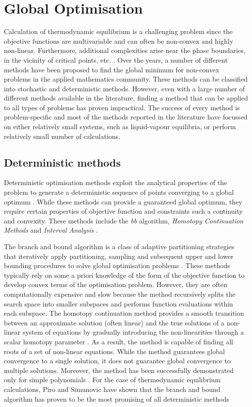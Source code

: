 	\section{Global Optimisation}
	Calculation of thermodynamic equilibrium is a challenging problem since the objective functions are multivariable and can often be non-convex and highly non-linear. Furthermore, additional complexities arise near the phase boundaries, in the vicinity of critical points, etc. \cite{Wakeham04,TEH2002745}. Over the years, a number of different methods have been proposed to find the global minimum for non-convex problems in the applied mathematics community. These methods can be classified into stochastic and deterministic methods. However, even with a large number of different methods available in the literature, finding a method that can be applied to all types of problems has proven impractical. The success of every method is problem-specific and most of the methods reported in the literature have focussed on either relatively small systems, such as liquid-vapour equilibria, or perform relatively small number of calculations.

	\subsection{Deterministic methods}
	Deterministic optimisation methods exploit the analytical properties of the problem to generate a deterministic sequence of points converging to a global optimum \cite{PARDALOS2000209}. While these methods can provide a guaranteed global optimum, they require certain properties of objective function and constraints such a continuity and convexity. These methods include the \emph{\gls{bb}} algorithm, \emph{Homotopy Continuation Methods}  and \emph{Interval Analysis} \cite{Floudas99}.

	The branch and bound algorithm is a class of adaptive partitioning strategies that iteratively apply partitioning, sampling and subsequent upper and lower bounding procedures to solve global optimisation problems \cite{Floudas99}.  These methods typically rely on some a priori knowledge of the form of the objective function to  develop convex terms of the optimisation problem. However, they are often computationally expensive and slow \cite{Wakeham04,Nichita02} because the method recursively splits the search space into smaller subspaces and performs function evaluations within each subspace. The homotopy continuation method provides a smooth transition between an approximate solution (often linear) and the true solutions of a non-linear system of equations by gradually introducing the non-linearities through a scalar homotopy parameter \cite{B.-Riggs:1994aa,JALALI20082333}. As a result, the method is capable of finding all roots of a set of non-linear equations. While the method guarantees global convergence to a single solution, it does not guarantee global convergence to multiple solutions. Moreover, the method has been successfully demonstrated only for simple polynomials \cite{Zhang11}.
For the case of thermodynamic equilibrium calculations, Piro and Simunovic \cite{Piro16} have shown that the branch and bound algorithm has proven to be the most promising of all deterministic methods

